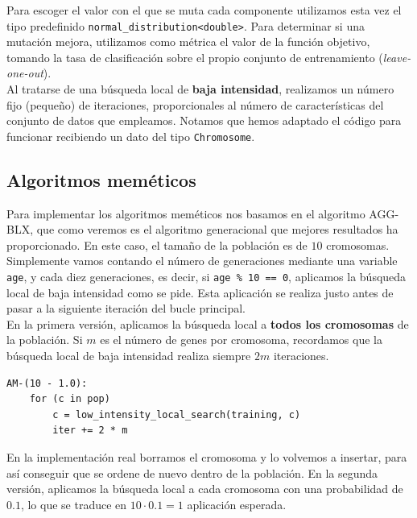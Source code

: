 \documentclass[12pt]{article}
\begin{document}
Para escoger el valor con el que se muta cada componente utilizamos esta vez el tipo predefinido \verb|normal_distribution<double>|. Para determinar si una mutación mejora, utilizamos como métrica el valor de la función objetivo, tomando la tasa de clasificación sobre el propio conjunto de entrenamiento (\textit{leave-one-out}).\\

Al tratarse de una búsqueda local de \textbf{baja intensidad}, realizamos un número fijo (pequeño) de iteraciones, proporcionales al número de características del conjunto de datos que empleamos. Notamos que hemos adaptado el código para funcionar recibiendo un dato del tipo \verb|Chromosome|.

\subsection*{Algoritmos meméticos}
\label{am}

Para implementar los algoritmos meméticos nos basamos en el algoritmo AGG-BLX, que como veremos es el algoritmo generacional que mejores resultados ha proporcionado. En este caso, el tamaño de la población es de $10$ cromosomas.\\

Simplemente vamos contando el número de generaciones mediante una variable \verb|age|, y cada diez generaciones, es decir, si \verb|age % 10 == 0|, aplicamos la búsqueda local de baja intensidad como se pide. Esta aplicación se realiza justo antes de pasar a la siguiente iteración del bucle principal.\\

En la primera versión, aplicamos la búsqueda local a \textbf{todos los cromosomas} de la población. Si $m$ es el número de genes por cromosoma, recordamos que la búsqueda local de baja intensidad realiza siempre $2m$ iteraciones.

\begin{verbatim}
AM-(10 - 1.0):
    for (c in pop)
        c = low_intensity_local_search(training, c)
        iter += 2 * m
\end{verbatim}

En la implementación real borramos el cromosoma y lo volvemos a insertar, para así conseguir que se ordene de nuevo dentro de la población. En la segunda versión, aplicamos la búsqueda local a cada cromosoma con una probabilidad de $0.1$, lo que se traduce en $10 \cdot 0.1 = 1$ aplicación esperada.
\end{document}
